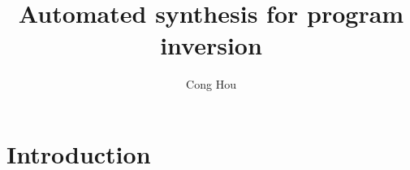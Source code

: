 \documentclass[12pt]{gatech-thesis}
\title{Automated synthesis for program inversion} %
\author{Cong Hou}
\begin{document}


\begin{preliminary}



\contents
\end{preliminary}
\chapter{Introduction}


\newcommand{\naive}{na\"ive\xspace}
\newcommand{\Program}{\ensuremath{P}\xspace}
\newcommand{\Forward}{\ensuremath{\Program^{+}}\xspace}
\newcommand{\Inverse}{\ensuremath{\Program^{-}}\xspace}
\newcommand{\Input}{\ensuremath{I}\xspace}
\newcommand{\Output}{\ensuremath{O}\xspace}
\newcommand{\ExtraOuts}{\ensuremath{S}\xspace}
\newcommand{\OutsS}{\ensuremath{\Outs+\ExtraOuts}\xspace}
\newcommand{\Var}{\ensuremath{v}\xspace}
\newcommand{\Vars}{\ensuremath{V}\xspace}
\newcommand{\Exec}[4]{\ensuremath{{#1}\{{#2}={#3}\} \rightarrow \{{#2}={#4}\}}\xspace}


\newcommand{\varmbox}[2]{\ensuremath{{#1}_{\tiny\mbox{#2}}}}
\newcommand{\vmu}{\ensuremath{\varmbox{v}{in}^I}\xspace}
\newcommand{\vinit}{\ensuremath{\varmbox{v}{in}}\xspace}
\newcommand{\veta}{\ensuremath{\varmbox{v}{\eta}}\xspace}
\newcommand{\vfinal}{\ensuremath{\varmbox{v}{out}}\xspace}
\newcommand{\vmup}{\ensuremath{\varmbox{v}{\mu}'}\xspace}
\newcommand{\viter}{\ensuremath{\varmbox{v}{out}^I}\xspace}
\newcommand{\viterp}{\ensuremath{\varmbox{v}{iter}'}\xspace}
\newcommand{\mufunc}{\ensuremath{\varmbox{v}{in}^I=\mu(v_{in},v_{out}^I)}\xspace}
\newcommand{\etafunc}{\ensuremath{\varmbox{v}{out}=\eta(v_{in}^I)}\xspace}
\newcommand{\Loop}{\ensuremath{L}\xspace}
\end{document}
